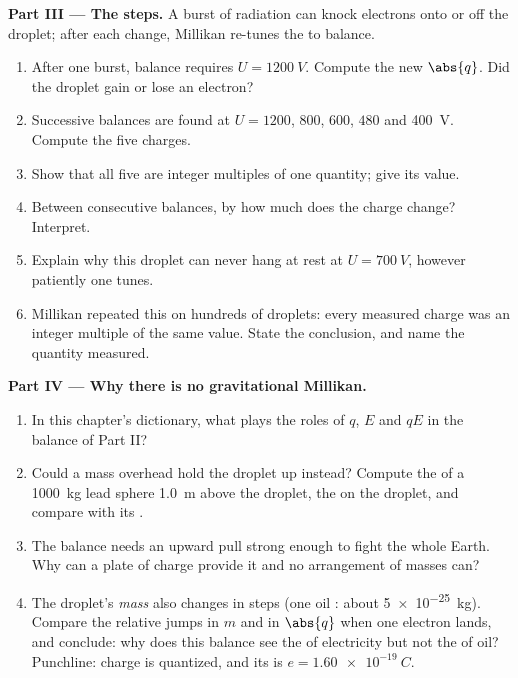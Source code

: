 \begin{problem}
\medskip
\noindent\textbf{Part III --- The steps.}
A burst of radiation can knock electrons onto or off the droplet; after
each change, Millikan re-tunes the  to balance.
\begin{enumerate}[resume]
  \item After one burst, balance requires $U = \qty{1200}{V}$. Compute
        the new $\abs{q}$. Did the droplet gain or lose an electron?
  \item Successive balances are found at $U = 1200$, $800$, $600$,
        $480$ and \qty{400}{V}. Compute the five charges.
  \item Show that all five are integer multiples of one quantity; give
        its value.
  \item Between consecutive balances, by how much does the charge
        change? Interpret.
  \item Explain why this droplet can never hang at rest at
        $U = \qty{700}{V}$, however patiently one tunes.
  \item Millikan repeated this on hundreds of droplets: every measured
        charge was an integer multiple of the same value. State the
        conclusion, and name the quantity measured.
\end{enumerate}

\medskip
\noindent\textbf{Part IV --- Why there is no gravitational Millikan.}
\begin{enumerate}[resume]
  \item In this chapter's dictionary, what plays the roles of $q$, $E$
        and $qE$ in the balance of Part II?
  \item Could a mass overhead hold the droplet up instead? Compute the
         of a \qty{1000}{kg} lead sphere \qty{1.0}{m} above the
        droplet, the  on the droplet, and compare with its .
  \item The balance needs an upward pull strong enough to fight the
        whole Earth. Why can a plate of charge provide it and no
        arrangement of masses can?
  \item The droplet's \emph{mass} also changes in steps (one oil
        : about \qty{5e-25}{kg}). Compare the relative jumps in
        $m$ and in $\abs{q}$ when one electron lands, and conclude: why
        does this balance see the  of electricity but not the
         of oil? Punchline: charge is quantized, and its 
        is $e = \qty{1.60e-19}{C}$.
\end{enumerate}
\end{problem}
